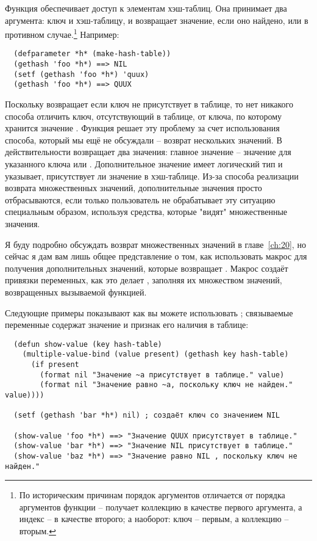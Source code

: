 Функция  обеспечивает доступ к элементам хэш-таблиц.  Она принимает два
аргумента: ключ и хэш-таблицу, и возвращает значение, если оно найдено, или  в
противном случае.\footnote{По историческим причинам порядок аргументов 
  отличается от порядка аргументов функции  --  получает коллекцию в
  качестве первого аргумента, а индекс -- в качестве второго; а  наоборот:
  ключ -- первым, а коллекцию -- вторым.}  Например:

\begin{verbatim}
  (defparameter *h* (make-hash-table))
  (gethash 'foo *h*) ==> NIL
  (setf (gethash 'foo *h*) 'quux)
  (gethash 'foo *h*) ==> QUUX
\end{verbatim}

Поскольку  возвращает  если ключ не присутствует в таблице, то нет
никакого способа отличить ключ, отсутствующий в таблице, от ключа, по которому хранится
значение .  Функция  решает эту проблему за счет использования
способа, который мы ещё не обсуждали -- возврат нескольких значений.  В действительности
 возвращает два значения: главное значение -- значение для указанного ключа
или .  Дополнительное значение имеет логический тип и указывает, присутствует ли
значение в хэш-таблице.  Из-за способа реализации возврата множественных значений,
дополнительные значения просто отбрасываются, если только пользователь не обрабатывает эту
ситуацию специальным образом, используя средства, которые "видят" множественные значения.

Я буду подробно обсуждать возврат множественных значений в главе~\ref{ch:20}, но сейчас я
дам вам лишь общее представление о том, как использовать макрос 
для получения дополнительных значений, которые возвращает .  Макрос
 создаёт привязки переменных, как это делает ,
заполняя их множеством значений, возвращенных вызываемой функцией.

Следующие примеры показывают как вы можете использовать ;
связываемые переменные содержат значение и признак его наличия в таблице:

\begin{lstlisting}  
  (defun show-value (key hash-table)
    (multiple-value-bind (value present) (gethash key hash-table)
      (if present
        (format nil "Значение ~a присутствует в таблице." value)
        (format nil "Значение равно ~a, поскольку ключ не найден." value))))

  (setf (gethash 'bar *h*) nil) ; создаёт ключ со значением NIL

  (show-value 'foo *h*) ==> "Значение QUUX присутствует в таблице."
  (show-value 'bar *h*) ==> "Значение NIL присутствует в таблице."
  (show-value 'baz *h*) ==> "Значение равно NIL , поскольку ключ не найден."
\end{lstlisting}

